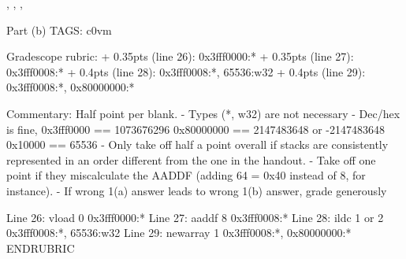 \begin{parts}
\begin{framed}
\bigskip
{}, , \ans{}, \ans{}

\end{framed}

\RUBRIC
Part (b)
TAGS: c0vm

Gradescope rubric:
+ 0.35pts (line 26): 0x3fff0000:*
+ 0.35pts (line 27): 0x3fff0008:*
+ 0.4pts (line 28): 0x3fff0008:*, 65536:w32
+ 0.4pts (line 29): 0x3fff0008:*, 0x80000000:*

Commentary:
  Half point per blank.
   - Types (*, w32) are not necessary
   - Dec/hex is fine, 0x3fff0000 == 1073676296
                      0x80000000 == 2147483648 or -2147483648
                      0x10000 == 65536
   - Only take off half a point overall if stacks are consistently
     represented in an order different from the one in the handout.
   - Take off one point if they miscalculate the AADDF
     (adding 64 = 0x40 instead of 8, for instance).
   - If wrong 1(a) answer leads to wrong 1(b) answer, grade generously

   Line 26: vload 0
                     0x3fff0000:*
   Line 27: aaddf 8
                     0x3fff0008:*
   Line 28: ildc 1 or 2
                     0x3fff0008:*, 65536:w32
   Line 29: newarray 1
                     0x3fff0008:*, 0x80000000:*
ENDRUBRIC

\end{parts}

